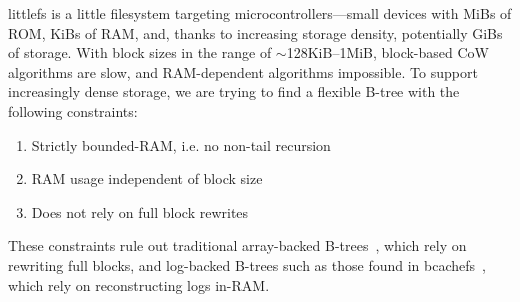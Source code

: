 \documentclass[letterpaper,twocolumn,10pt]{article}
\def\lfs+{littlefs}
\begin{document}
\lfs+ is a little filesystem targeting microcontrollers---small devices with
MiBs of ROM, KiBs of RAM, and, thanks to
increasing storage density, potentially GiBs of storage.
With block sizes in the range of {$\sim$}128KiB--1MiB,
block-based CoW algorithms are slow, and
RAM-dependent algorithms impossible.
To support increasingly dense storage, we are trying to find a flexible
B-tree with the following constraints:
\begin{enumerate}
\item Strictly bounded-RAM, i.e. no non-tail recursion
\item RAM usage independent of block size
\item Does not rely on full block rewrites
\end{enumerate}
These constraints rule out traditional array-backed
B-trees~\cite{ubiquitous-btree}, %
which rely on rewriting full blocks,
and
log-backed B-trees such as those found in bcachefs~\cite{bcachefs},
which rely on
reconstructing logs in-RAM.
\end{document}
